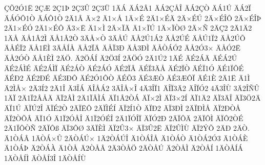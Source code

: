 {^^c7^^d52^^d31^^cb
2^^c7^^c6
2^^c71^^de
2^^c73^^db
2^^c73^^dc
1^^c4^^c1
^^c4^^c12^^c21
^^c4^^c12^^c7^^c5^^ce
^^c4^^c12^^c7^^d2
^^c4^^c11^^da
^^c4^^c12^^cf
^^c4^^c1^^d3^^d41^^d2
^^c4^^c1^^d41^^d2
2^^c41^^c2
^^c4^^d72
^^c41^^d7^^c5
1^^c4^^d7^^c9
2^^c41^^d7^^c9^^c4
2^^c4^^d7^^c9^^da
2^^c4^^d7^^c9^^ce^^d4
2^^c4^^d7^^c9^^ce^^de
2^^c41^^d7^^c9^^d3
2^^c41^^d7^^c9^^d4
^^c43^^d7^^cb
^^c41^^d7^^cc
2^^c4^^d7^^cf^^c4
^^c41^^d7^^cf^^da
1^^c4^^d7^^cf^^d2^^d8
2^^c4^^d7^^d1
2^^c4^^c72
2^^c41^^c42
1^^c4^^c5
^^c4^^c51^^c22^^cc
^^c4^^c51^^c22^^d2
3^^c4^^c5^^d7^^d2
3^^c4^^c5^^da
^^c4^^c52^^da1^^c12
^^c4^^c52^^da^^c9
^^c4^^c5^^da1^^cf2
^^c4^^c52^^da^^d5
^^c4^^c5^^c9^^cf2
^^c4^^c51^^cb^^cc
3^^c4^^c5^^cd^^c5
^^c4^^c52^^cf^^c4
^^c4^^c5^^cf3^^d0
^^c4^^c53^^d0^^cc
^^c4^^c5^^d2^^c1^^d32
^^c4^^c52^^d33^^d7
^^c4^^c5^^d32^^cb
^^c4^^c52^^d3^^d2
^^c4^^c51^^c8^^cc
2^^c4^^d6.
^^c42^^d6^^c1^^cd
^^c42^^d63^^cd
2^^c4^^d6^^d3
2^^c41^^da2
1^^c4^^c9
^^c4^^c92^^c1^^c4
^^c4^^c9^^c12^^da
^^c4^^c92^^c1^^cc^^c9
^^c4^^c92^^c1^^cc^^cf
^^c4^^c92^^c1^^d2
^^c4^^c92^^c1^^d3
^^c4^^c92^^cf^^c2
^^c4^^c9^^cf3^^c4^^c5
^^c4^^c92^^cf^^d2
^^c4^^c9^^cf1^^d3
^^c4^^c91^^cf^^d4^^c9
^^c4^^c9^^d02
^^c4^^c92^^d0^^c9
^^c4^^c93^^d0^^d4
^^c4^^c92^^d31^^d4^^d2
^^c4^^c9^^d53
^^c4^^c93^^c6^^d2
^^c4^^c93^^c6^^d4^^cf
^^c4^^c91^^c8
2^^c41^^cb
^^c41^^cc
^^c42^^cc^^c5^^d7
2^^c43^^cd2
2^^c41^^ce
^^c43^^ce^^c1
^^c4^^ce^^c5^^c12
3^^c4^^ce^^c5^^d7^^ce
4^^c43^^ce^^cf1
^^c4^^ce^^cf3^^c42
^^c4^^ce^^cf^^d32
4^^c43^^ce^^d9
3^^c42^^ce^^d1^^db
1^^c4^^cf
2^^c41^^cf2^^c2^^c5^^c4
^^c4^^cf2^^c2^^cc
2^^c41^^cf^^c2^^cc^^c1
^^c4^^cf1^^c22^^d2^^c1
^^c4^^cf^^d72^^cc
^^c4^^cf3^^d72^^cd
^^c4^^cf1^^c42
^^c4^^cf3^^c4^^ce
^^c4^^cf3^^d62^^c4
^^c4^^cf1^^da
^^c4^^cf^^da2^^ce
^^c4^^cf^^c92^^d2
2^^c4^^cf^^cb^^d4
2^^c4^^cf^^cc^^c9^^cd
^^c4^^cf2^^cd1^^d2
^^c4^^cf^^d02
^^c4^^cf3^^d0^^cc
2^^c4^^cf^^d0^^cc^^c5
^^c4^^cf2^^d0^^d2^^c5
^^c4^^cf2^^d2^^d5^^c2
^^c4^^cf1^^d3
^^c41^^cf2^^d3^^c5^^ce
^^c41^^cf2^^d3^^c9^^ce
2^^c41^^cf^^d3^^ce^^cf
^^c4^^cf^^d32^^d0
2^^c4^^cf^^d4^^c4
2^^c4^^cf^^d4^^cc
^^c4^^cf^^d42^^d2^^c9
2^^c41^^cf^^d4^^d2^^d1
2^^c4^^cf^^d4^^df
^^c4^^cf3^^d4^^d8
3^^c4^^cf^^c8^^cc
^^c4^^cf2^^db3^^d7
^^c4^^cf3^^db2^^cb
^^c4^^cf2^^db^^cc^^d9
^^c4^^cf2^^dd^^d5
2^^c4^^d0
2^^c4^^d2.
^^c41^^d2^^c1^^c2
1^^c4^^d2^^c1^^d7^^db
2^^c4^^d2^^c1^^da^^d7
1^^c42^^d2^^c1^^da^^ce
^^c41^^d2^^c1^^ce^^c5
^^c41^^d2^^c1^^d2
^^c41^^d2^^c12^^d33
^^c41^^d2^^c1^^c8
^^c41^^d2^^c1^^de
^^c42^^d2^^c1^^c0
^^c41^^d2^^c5
^^c42^^d2^^c5^^c2
2^^c43^^d2^^c5^^d6
2^^c4^^d2^^c5^^da
^^c42^^d2^^c5^^cc
^^c42^^d2^^c5^^cd
1^^c4^^d2^^c5^^cd^^c1
1^^c4^^d2^^c5^^cd^^cc
^^c4^^d2^^c5^^cd3^^ce
1^^c4^^d2^^c5^^cd^^d9
}
